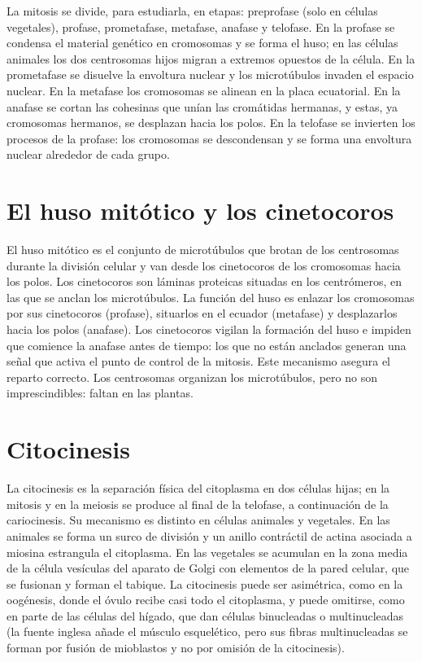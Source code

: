 \documentclass{book}
\begin{document}
La mitosis se divide, para estudiarla, en etapas: preprofase (solo en células vegetales), profase, prometafase, metafase, anafase y telofase. En la profase se condensa el material genético en cromosomas y se forma el huso; en las células animales los dos centrosomas hijos migran a extremos opuestos de la célula. En la prometafase se disuelve la envoltura nuclear y los microtúbulos invaden el espacio nuclear. En la metafase los cromosomas se alinean en la placa ecuatorial. En la anafase se cortan las cohesinas que unían las cromátidas hermanas, y estas, ya cromosomas hermanos, se desplazan hacia los polos. En la telofase se invierten los procesos de la profase: los cromosomas se descondensan y se forma una envoltura nuclear alrededor de cada grupo.


\section{El huso mitótico y los cinetocoros}

El huso mitótico es el conjunto de microtúbulos que brotan de los centrosomas durante la división celular y van desde los cinetocoros de los cromosomas hacia los polos. Los cinetocoros son láminas proteicas situadas en los centrómeros, en las que se anclan los microtúbulos. La función del huso es enlazar los cromosomas por sus cinetocoros (profase), situarlos en el ecuador (metafase) y desplazarlos hacia los polos (anafase). Los cinetocoros vigilan la formación del huso e impiden que comience la anafase antes de tiempo: los que no están anclados generan una señal que activa el punto de control de la mitosis. Este mecanismo asegura el reparto correcto. Los centrosomas organizan los microtúbulos, pero no son imprescindibles: faltan en las plantas.


\section{Citocinesis}

La citocinesis es la separación física del citoplasma en dos células hijas; en la mitosis y en la meiosis se produce al final de la telofase, a continuación de la cariocinesis. Su mecanismo es distinto en células animales y vegetales. En las animales se forma un surco de división y un anillo contráctil de actina asociada a miosina estrangula el citoplasma. En las vegetales se acumulan en la zona media de la célula vesículas del aparato de Golgi con elementos de la pared celular, que se fusionan y forman el tabique. La citocinesis puede ser asimétrica, como en la oogénesis, donde el óvulo recibe casi todo el citoplasma, y puede omitirse, como en parte de las células del hígado, que dan células binucleadas o multinucleadas (la fuente inglesa añade el músculo esquelético, pero sus fibras multinucleadas se forman por fusión de mioblastos y no por omisión de la citocinesis).
\end{document}
